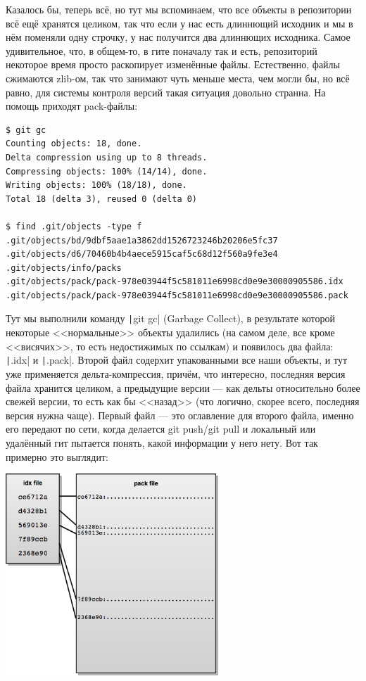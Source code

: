 \documentclass[a5paper]{article}
\begin{document}
Казалось бы, теперь всё, но тут мы вспоминаем, что все объекты в репозитории всё ещё хранятся целиком, так что если у нас есть длиннющий исходник и мы в нём поменяли одну строчку, у нас получится два длиннющих исходника. Самое удивительное, что, в общем-то, в гите поначалу так и есть, репозиторий некоторое время просто раскопирует изменённые файлы. Естественно, файлы сжимаются zlib-ом, так что занимают чуть меньше места, чем могли бы, но всё равно, для системы контроля версий такая ситуация довольно странна. На помощь приходят pack-файлы:

\begin{verbatim}
$ git gc
Counting objects: 18, done.
Delta compression using up to 8 threads.
Compressing objects: 100% (14/14), done.
Writing objects: 100% (18/18), done.
Total 18 (delta 3), reused 0 (delta 0)

$ find .git/objects -type f
.git/objects/bd/9dbf5aae1a3862dd1526723246b20206e5fc37
.git/objects/d6/70460b4b4aece5915caf5c68d12f560a9fe3e4
.git/objects/info/packs
.git/objects/pack/pack-978e03944f5c581011e6998cd0e9e30000905586.idx
.git/objects/pack/pack-978e03944f5c581011e6998cd0e9e30000905586.pack
\end{verbatim}

Тут мы выполнили команду \texttt|git gc| (Garbage Collect), в результате которой некоторые <<нормальные>> объекты удалились (на самом деле, все кроме <<висячих>>, то есть недостижимых по ссылкам) и появилось два файла: \texttt|.idx| и \texttt|.pack|. Второй файл содерхит упакованными все наши объекты, и тут уже применяется дельта-компрессия, причём, что интересно, последняя версия файла хранится целиком, а предыдущие версии --- как дельты относительно более свежей версии, то есть как бы <<назад>> (что логично, скорее всего, последняя версия нужна чаще). Первый файл --- это оглавление для второго файла, именно его передают по сети, когда делается git push/git pull и локальный или удалённый гит пытается понять, какой информации у него нету. Вот так примерно это выглядит:

\begin{center}
	\includegraphics[width=0.6\textwidth]{gitPackFiles.png}
\end{center}
\end{document}
